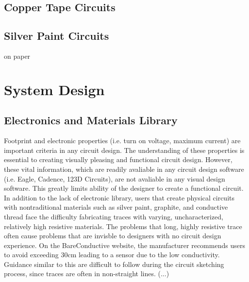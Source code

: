 \documentclass{sigchi}
\begin{document}

\subsection{Copper Tape Circuits}
\subsection{Silver Paint Circuits}
on paper


\section{System Design}

\subsection{Electronics and Materials Library}
Footprint and electronic properties (i.e. turn on voltage, maximum current) are important criteria in any circuit design. The understanding of these properties is essential to creating visually pleasing and functional circuit design. However, these vital information, which are readily avaliable in any circuit design software (i.e. Eagle, Cadence, 123D Circuits), are not avaliable in any visual design software. This greatly limits ability of the designer to create a functional circuit. In addition to the lack of electronic library, users that create physical circuits with nontraditional materials such as silver paint, graphite, and conductive thread face the difficulty fabricating traces with varying, uncharacterized, relatively high resistive materials. The problems that long, highly resistive trace often cause problems that are invisble to designers with no circuit design experience. On the BareConductive website, the manufacturer recommends users to avoid exceeding 30cm leading to a sensor due to the low conductivity. Guidance similar to this are difficult to follow during the circuit sketching process, since traces are often in non-straight lines. (...) 
\end{document}
